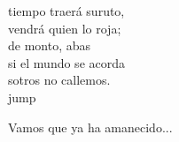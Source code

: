 \begin{cancion}
	 tiempo traerá suruto,\\
	 vendrá quien lo roja;\\
	de monto, abas\\
	si el mundo se acorda\\
	sotros no callemos.\\jump\\
	\begin{chorus}%
Vamos que ya ha amanecido...\\
	\end{chorus}%
	\jump\\
\end{cancion}%
